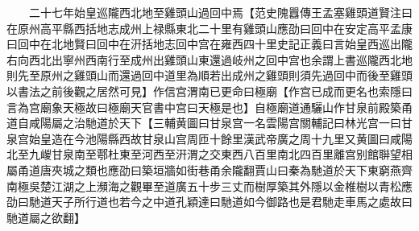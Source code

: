 　　二十七年始皇巡隴西北地至雞頭山過回中焉【范史隗囂傳王孟塞雞頭道賢注曰在原州高平縣西括地志成州上禄縣東北二十里有雞頭山應劭曰回中在安定高平孟康曰回中在北地賢曰回中在汧括地志回中宫在雍西四十里史記正義曰言始皇西巡出隴右向西北出寧州西南行至成州出雞頭山東還過岐州之回中宫也余謂上書巡隴西北地則先至原州之雞頭山而還過回中道里為順若出成州之雞頭則須先過回中而後至雞頭以書法之前後觀之居然可見】作信宫渭南已更命曰極廟【作宫已成而更名也索隱曰言為宫廟象天極故曰極廟天官書中宫曰天極是也】自極廟道通驪山作甘泉前殿築甬道自咸陽屬之治馳道於天下【三輔黄圖曰甘泉宫一名雲陽宫關輔記曰林光宫一曰甘泉宫始皇造在今池陽縣西故甘泉山宫周匝十餘里漢武帝廣之周十九里又黄圖曰咸陽北至九嵕甘泉南至鄠杜東至河西至汧渭之交東西八百里南北四百里離宫别館聨望相屬甬道唐夾城之類也應劭曰築垣牆如街巷甬余隴翻賈山曰秦為馳道於天下東窮燕齊南極吳楚江湖之上瀕海之觀畢至道廣五十步三丈而樹厚築其外隱以金椎樹以青松應劭曰馳道天子所行道也若今之中道孔穎達曰馳道如今御路也是君馳走車馬之處故曰馳道屬之欲翻】

